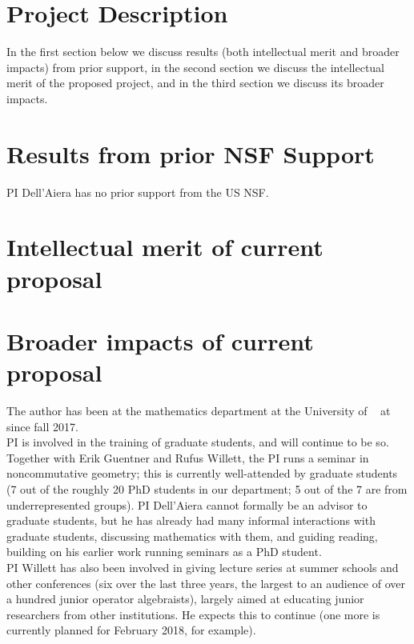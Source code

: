 \documentclass[11pt]{article}
\begin{document}
\section*{Project Description}


In the first section below we discuss results (both intellectual merit and broader impacts) from prior support, in the second section we discuss the intellectual merit of the proposed project, and in the third section we discuss its broader impacts.
 
\section{Results from prior NSF Support}

PI Dell'Aiera has no prior support from the US NSF.  

\section{Intellectual merit of current proposal}


%

\section{Broader impacts of current proposal}
  
The author has been at the mathematics department at the University of \Hawaii~ at \Manoa~ since fall 2017.\\  

PI is involved in the training of graduate students, and will continue to be so. Together with Erik Guentner and Rufus Willett, the PI runs a seminar in noncommutative geometry; this is currently well-attended by graduate students (7 out of the roughly 20 PhD students in our department; 5 out of the 7 are from underrepresented groups). PI Dell'Aiera cannot formally be an advisor to graduate students, but he has already had many informal interactions with graduate students, discussing mathematics with them, and guiding reading, building on his earlier work running seminars as a PhD student.\\

PI Willett has also been involved in giving lecture series at summer schools and other conferences (six over the last three years, the largest to an audience of over a hundred junior operator algebraists), largely aimed at educating junior researchers from other institutions.  He expects this to continue (one more is currently planned for February 2018, for example).  
\end{document}
